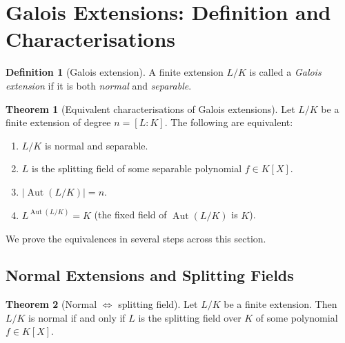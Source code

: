 \documentclass[12pt,a4paper,openany]{book}
\theoremstyle{definition}
\newtheorem{definition}{Definition}[chapter]
\newtheorem{theorem}{Theorem}[chapter]
\theoremstyle{remark}
\DeclareMathOperator{\Aut}{Aut}
\begin{document}
\section{Galois Extensions: Definition and Characterisations}
\label{sec:galois-def}

\begin{definition}[Galois extension]\label{def:galois-ext}
A finite extension $L/K$ is called a \emph{Galois extension}
if it is both \emph{normal} and \emph{separable}.
\end{definition}

\begin{theorem}[Equivalent characterisations of Galois extensions]
\label{thm:galois-equiv}
Let $L/K$ be a finite extension of degree $n=[L:K]$.  The following are
equivalent:
\begin{enumerate}
\item\label{it:gal-ns} $L/K$ is normal and separable.
\item\label{it:gal-split} $L$ is the splitting field of some separable
      polynomial $f\in K[X]$.
\item\label{it:gal-aut} $|\!\Aut(L/K)|=n$.
\item\label{it:gal-fix} $L^{\Aut(L/K)}=K$ (the fixed field of $\Aut(L/K)$ is $K$).
\end{enumerate}
\end{theorem}

We prove the equivalences in several steps across this section.

\subsection{Normal Extensions and Splitting Fields}
\label{subsec:normal-splitting}

\begin{theorem}[Normal $\Longleftrightarrow$ splitting field]\label{thm:normal-splitting}
Let $L/K$ be a finite extension.  Then $L/K$ is normal if and only if
$L$ is the splitting field over $K$ of some polynomial $f\in K[X]$.
\end{theorem}
\end{document}
